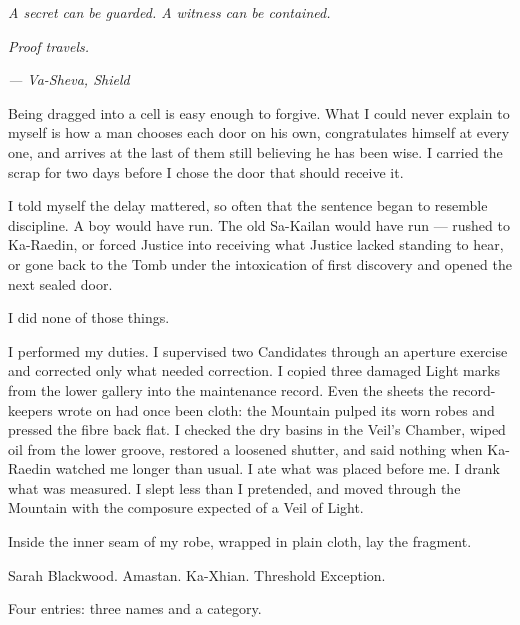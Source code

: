 
\textit{A secret can be guarded. A witness can be contained.}\par
\textit{Proof travels.}\par
\textit{--- Va-Sheva, Shield}\par

\ornament

Being dragged into a cell is easy enough to forgive. What I could never explain to myself is how a man chooses each door on his own, congratulates himself at every one, and arrives at the last of them still believing he has been wise. I carried the scrap for two days before I chose the door that should receive it.\par

\ornament

I told myself the delay mattered, so often that the sentence began to resemble discipline. A boy would have run. The old Sa-Kailan would have run --- rushed to Ka-Raedin, or forced Justice into receiving what Justice lacked standing to hear, or gone back to the Tomb under the intoxication of first discovery and opened the next sealed door.\par

I did none of those things.\par

I performed my duties. I supervised two Candidates through an aperture exercise and corrected only what needed correction. I copied three damaged Light marks from the lower gallery into the maintenance record. Even the sheets the record-keepers wrote on had once been cloth: the Mountain pulped its worn robes and pressed the fibre back flat. I checked the dry basins in the Veil's Chamber, wiped oil from the lower groove, restored a loosened shutter, and said nothing when Ka-Raedin watched me longer than usual. I ate what was placed before me. I drank what was measured. I slept less than I pretended, and moved through the Mountain with the composure expected of a Veil of Light.\par

Inside the inner seam of my robe, wrapped in plain cloth, lay the fragment.\par

Sarah Blackwood. Amastan. Ka-Xhian. Threshold Exception.\par

Four entries: three names and a category.\par

